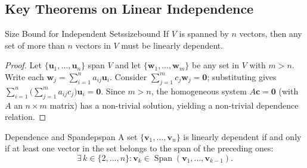 \documentclass[12pt,a4paper]{article}
\newcommand{\vv}[1]{\mathbf{#1}}
\newcommand{\vzero}{\mathbf{0}}
\DeclareMathOperator{\Span}{Span}
\begin{document}
\begin{center}
		\end{center}
		
		\subsection{Key Theorems on Linear Independence}
		
		\begin{theorem}{Size Bound for Independent Sets}{sizebound}
			If $V$ is spanned by $n$ vectors, then any set of more than $n$ vectors
			in $V$ must be linearly dependent.
		\end{theorem}
		
		\begin{proof}
			Let $\{\vv{u}_1, \ldots, \vv{u}_n\}$ span $V$ and let
			$\{\vv{w}_1, \ldots, \vv{w}_m\}$ be any set in $V$ with $m > n$.
			Write each $\vv{w}_j = \sum_{i=1}^n a_{ij}\vv{u}_i$.  Consider
			$\sum_{j=1}^m c_j\vv{w}_j = \vzero$; substituting gives
			$\sum_{i=1}^n \bigl(\sum_{j=1}^m a_{ij}c_j\bigr)\vv{u}_i = \vzero$.
			Since $m > n$, the homogeneous system $A\vv{c} = \vzero$ (with $A$ an
			$n \times m$ matrix) has a non-trivial solution, yielding a non-trivial
			dependence relation.
		\end{proof}
		
		\begin{theorem}{Dependence and Span}{depspan}
			A set $\{\vv{v}_1, \ldots, \vv{v}_n\}$ is linearly dependent if and only if
			at least one vector in the set belongs to the span of the preceding ones:
			\[
			\exists\, k \in \{2, \ldots, n\} :
			\vv{v}_k \in \Span(\vv{v}_1, \ldots, \vv{v}_{k-1}).
			\]
		\end{theorem}
		
\end{document}
